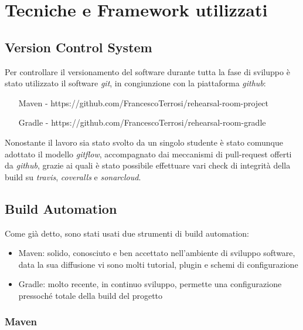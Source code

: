 \chapter{Tecniche e Framework utilizzati}

\section{Version Control System}

Per controllare il versionamento del software durante tutta la fase di sviluppo è stato utilizzato il software \textsl{git}, in congiunzione con la piattaforma \textsl{github}:
\begin{itemize}
	\item[Maven -] https://github.com/FrancescoTerrosi/rehearsal-room-project
	\item[Gradle -] https://github.com/FrancescoTerrosi/rehearsal-room-gradle
\end{itemize}

Nonostante il lavoro sia stato svolto da un singolo studente è stato comunque adottato il modello \textsl{gitflow}, accompagnato dai meccanismi di pull-request offerti da \textsl{github}, grazie ai quali è stato possibile effettuare vari check di integrità della build su \textsl{travis}, \textsl{coveralls} e \textsl{sonarcloud}.

\section{Build Automation}

Come già detto, sono stati usati due strumenti di build automation:
\begin{itemize}
	\item Maven: solido, conosciuto e ben accettato nell'ambiente di sviluppo software, data la sua diffusione vi sono molti tutorial, plugin e schemi di configurazione
	\item Gradle: molto recente, in continuo sviluppo, permette una configurazione pressoché totale della build del progetto
\end{itemize}

\subsection{Maven}

